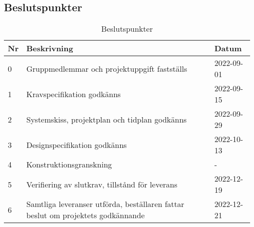 \documentclass[10pt,oneside,swedish]{lips}
\begin{document}
\subsection{Beslutspunkter}
\begin{table}[htpb]
    \centering
    \caption{Beslutspunkter}
    \label{tab:BPs}
    \begin{tabular}{|l|p{80mm}|l|}
    \hline
      {\bfseries Nr} & 
      {\bfseries Beskrivning} & 
      {\bfseries Datum}  \\
      \hline
      \hline
      0 & Gruppmedlemmar och projektuppgift fastställs & 2022-09-01 \\
      \hline
      1 & Kravspecifikation godkänns & 2022-09-15 \\
      \hline
      2 & Systemskiss, projektplan och tidplan godkänns  & 2022-09-29 \\
      \hline
      3 & Designspecifikation godkänns & 2022-10-13 \\
      \hline
      4 & Konstruktionsgranskning & - \\
      \hline
      5 & Verifiering av slutkrav, tillstånd för leverans & 2022-12-19 \\
      \hline
      6 & Samtliga leveranser utförda, beställaren fattar beslut om projektets godkännande & 2022-12-21 \\
      \hline
    \end{tabular}
\end{table}

\pagebreak
\end{document}
